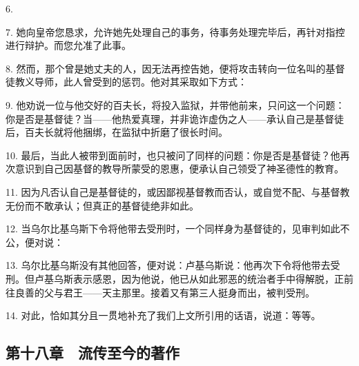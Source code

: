 6. \par

7. 她向皇帝您恳求，允许她先处理自己的事务，待事务处理完毕后，再针对指控进行辩护。而您允准了此事。\par

8. 然而，那个曾是她丈夫的人，因无法再控告她，便将攻击转向一位名叫的基督徒教义导师，此人曾受到的惩罚。他对其采取如下方式：\par

9. 他劝说一位与他交好的百夫长，将投入监狱，并带他前来，只问这一个问题：你是否是基督徒？当——他热爱真理，并非诡诈虚伪之人——承认自己是基督徒后，百夫长就将他捆绑，在监狱中折磨了很长时间。\par

10. 最后，当此人被带到面前时，也只被问了同样的问题：你是否是基督徒？他再次意识到自己因基督的教导所蒙受的恩惠，便承认自己领受了神圣德性的教育。\par

11. 因为凡否认自己是基督徒的，或因鄙视基督教而否认，或自觉不配、与基督教无份而不敢承认；但真正的基督徒绝非如此。\par

12. 当乌尔比基乌斯下令将他带去受刑时，一个同样身为基督徒的，见审判如此不公，便对说：\par

13. 乌尔比基乌斯没有其他回答，便对说：卢基乌斯说：他再次下令将他带去受刑。但卢基乌斯表示感恩，因为他说，他已从如此邪恶的统治者手中得解脱，正前往良善的父与君王——天主那里。接着又有第三人挺身而出，被判受刑。\par

14. 对此，恰如其分且一贯地补充了我们上文所引用的话语，说道：等等。\par


\subsection{第十八章　流传至今的著作}

